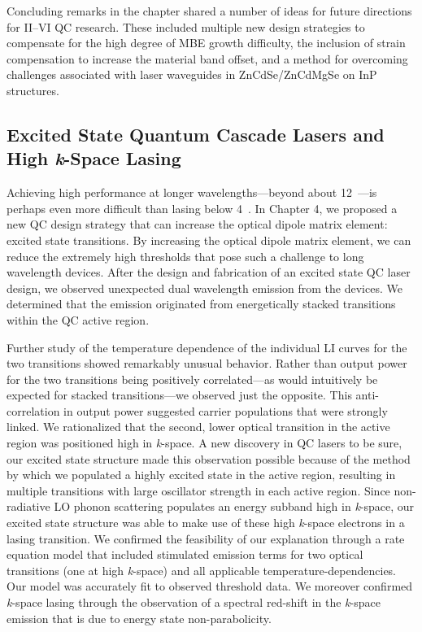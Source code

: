 Concluding remarks in the chapter shared a number of ideas for future directions for II--VI QC research.  These included multiple new design strategies to compensate for the high degree of MBE growth difficulty, the inclusion of strain compensation to increase the material band offset, and a method for overcoming challenges associated with laser waveguides in ZnCdSe/ZnCdMgSe on InP structures.


\subsection{Excited State Quantum Cascade Lasers and High \textit{k}-Space Lasing}

Achieving high performance at longer wavelengths---beyond about 12~\um---is perhaps even more difficult than lasing below 4~\um.  In Chapter 4, we proposed a new QC design strategy that can increase the optical dipole matrix element: excited state transitions.  By increasing the optical dipole matrix element, we can reduce the extremely high thresholds that pose such a challenge to long wavelength devices.  After the design and fabrication of an excited state QC laser design, we observed unexpected dual wavelength emission from the devices.  We determined that the emission originated from energetically stacked transitions within the QC active region.

Further study of the temperature dependence of the individual LI curves for the two transitions showed remarkably unusual behavior. Rather than output power for the two transitions being positively correlated---as would intuitively be expected for stacked transitions---we observed just the opposite.  This anti-correlation in output power suggested carrier populations that were strongly linked.  We rationalized that the second, lower optical transition in the active region was positioned high in \linebreak \emph{k}-space.  A new discovery in QC lasers to be sure, our excited state structure made this observation possible because of the method by which we populated a highly excited state in the active region, resulting in multiple transitions with large oscillator strength in each active region.  Since non-radiative LO phonon scattering populates an energy subband high in \emph{k}-space, our excited state structure was able to make use of these high \emph{k}-space electrons in a lasing transition.  We confirmed the feasibility of our explanation through a rate equation model that included stimulated emission terms for two optical transitions (one at high \emph{k}-space) and all applicable temperature-dependencies.  Our model was accurately fit to observed threshold data.  We moreover confirmed \emph{k}-space lasing through the observation of a spectral red-shift in the \emph{k}-space emission that is due to energy state non-parabolicity.

